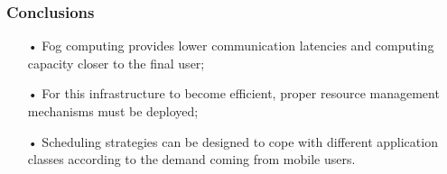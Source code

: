 \documentclass[10pt, pdf, xcolor=pdftex, dvipsnames, table]{beamer}
\begin{document}
\begin{frame}
	\frametitle{Conclusions}
 	\begin{block}{}
 		\begin{itemize}
 			\item[•] Fog computing provides lower communication latencies and computing capacity closer to the final user;\newline
 			\item[•] For this infrastructure to become efficient, proper resource management mechanisms must be deployed;
 			\newline
 			\item[•] Scheduling strategies can be designed to cope with different application classes according to the demand coming from mobile users.
 		\end{itemize}
 	\end{block}
\end{frame}


%
%
%	
\end{document}
